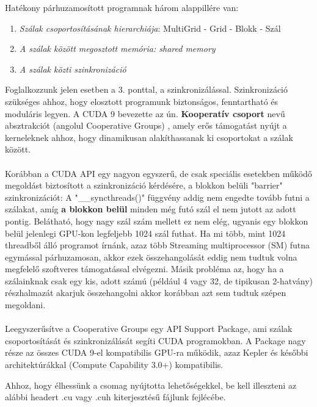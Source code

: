 Hatékony párhuzamosított programnak három alappillére van: \cite{kvantum_optim}
\begin{enumerate}
	\item \emph{Szálak csoportosításának hierarchiája}: MultiGrid - Grid - Blokk - Szál
	\item \emph{A szálak között megosztott memória: shared memory}
	\item \emph{A szálak közti szinkronizáció}
\end{enumerate}
Foglalkozzunk jelen esetben a 3. ponttal, a szinkronizálással. Szinkronizáció szükséges ahhoz, hogy elosztott programunk biztonságos, fenntartható és moduláris legyen. A CUDA 9 bevezette az ún. \textbf{Kooperatív csoport} nevű absztrakciót (angolul Cooperative Groups) \cite{CUDAdoc_coopGroups}, amely erős támogatást nyújt a kerneleknek ahhoz, hogy dinamikusan alakíthassanak ki csoportokat a szálak között.

\paragraph{}
Korábban a CUDA API egy nagyon egyszerű, de csak speciális esetekben működő megoldást biztosított a szinkronizáció kérdésére, a blokkon belüli "barrier" szinkronizációt: A "\_\_syncthreads()" függvény addig nem engedte tovább futni a szálakat, amíg \textbf{a blokkon belül} minden még futó szál el nem jutott az adott pontig. Belátható, hogy nagy szál szám mellett ez nem elég, ugyanis egy blokkon belül jelenlegi GPU-kon legfeljebb 1024 szál futhat. Ha mi több, mint 1024 threadből álló programot írnánk, azaz több Streaming multiprocessor (SM) futna egymással párhuzamosan, akkor ezek összehangolását eddig nem tudtuk volna megfelelő szoftveres támogatással elvégezni. Másik probléma az, hogy ha a szálainknak csak egy kis, adott számú (például 4 vagy 32, de tipikusan 2-hatvány) részhalmazát akarjuk összehangolni akkor korábban azt sem tudtuk szépen megoldani.

\paragraph{}
Leegyszerűsítve a Cooperative Groups egy API Support Package, ami szálak csoportosítását és szinkronizálását segíti CUDA programokban. A Package nagy része az összes CUDA 9-el kompatibilis GPU-ra működik, azaz Kepler és későbbi architektúrákkal (Compute Capability 3.0+) kompatibilis.

Ahhoz, hogy élhessünk a csomag nyújtotta lehetőségekkel, be kell illeszteni az alábbi headert .cu vagy .cuh kiterjesztésű fájlunk fejlécébe.

